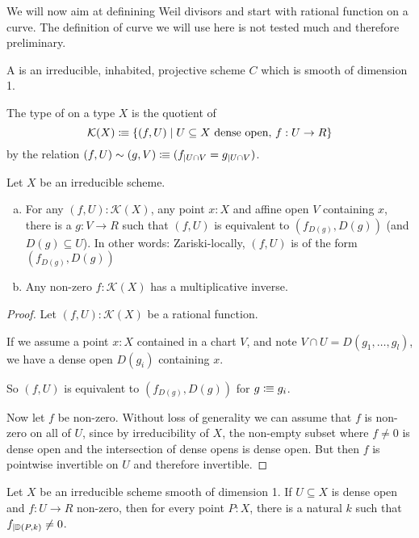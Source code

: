 We will now aim at definining Weil divisors and start with rational function on a curve.
The definition of curve we will use here is not tested much and therefore preliminary.

\begin{definition}
  A  is an irreducible, inhabited, projective scheme $C$ which is smooth of dimension 1.
\end{definition}

\begin{definition}
  The type of  on a type $X$ is the quotient of
  \[
  \mathcal K(X)\vcentcolon\mspace{-1.2mu}\equiv \{(f,U)\mid U\subseteq X\text{  dense open, } f:U\to R \}
  \]
  by the relation $(f,U) \sim (g,V) \vcentcolon\mspace{-1.2mu}\equiv (f_{\mid U\cap V}=g_{\mid U\cap V})$.
\end{definition}

\begin{lemma}
  Let $X$ be an irreducible scheme.
  \begin{enumerate}[(a)]
  \item For any $(f,U):\mathcal K(X)$, any point $x:X$ and affine open $V$ containing $x$,
    there is a $g:V\to R$ such that $(f,U)$ is equivalent to $(f_{D(g)},D(g))$ (and $D(g)\subseteq U$).
    In other words: Zariski-locally, $(f,U)$ is of the form $(f_{D(g)},D(g))$
  \item Any non-zero $f:\mathcal K(X)$ has a multiplicative inverse.
  \end{enumerate}
\end{lemma}

\begin{proof}
  Let  $(f,U):\mathcal K(X)$ be a rational function.

  If we assume a point $x:X$ contained in a chart $V$,
  and note $V\cap U = D(g_1,\dots,g_l)$,
  we have a dense open $D(g_i)$ containing $x$.

  So $(f,U)$ is equivalent to $(f_{D(g)},D(g))$ for $g\vcentcolon\mspace{-1.2mu}\equiv g_i$.

  Now let $f$ be non-zero.
  Without loss of generality we can assume that $f$ is non-zero on all of $U$,
  since by irreducibility of $X$, the non-empty subset where $f \neq 0$ is dense open
  and the intersection of dense opens is dense open.
  But then $f$ is pointwise invertible on $U$ and therefore invertible.
\end{proof}

\begin{lemma}
  \label{order-is-bounded}
  Let $X$ be an irreducible scheme smooth of dimension 1.
  If $U\subseteq X$ is dense open and $f:U\to R$ non-zero,
  then for every point $P:X$, there is a natural $k$ such that $f_{|\mathbb{D}(P,k)}\neq 0$.
\end{lemma}

